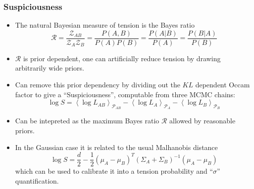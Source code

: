 \documentclass[aspectratio=169]{beamer}
\newcommand{\mean}[2][]{\left\langle#2\right\rangle_{#1}}
\begin{document}
\begin{frame}
    \frametitle{Suspiciousness  }

    \begin{itemize}
        \item The natural Bayesian measure of tension is the Bayes ratio
            \begin{equation}
                \mathcal{R} = \frac{\mathcal{Z}_{AB}}{\mathcal{Z}_A\mathcal{Z}_B} = \frac{P(A,B)}{P(A)P(B)} = \frac{P(A|B)}{P(A)}= \frac{P(B|A)}{P(B)}
            \end{equation}
        \item $\mathcal{R}$ is prior dependent, one can artificially reduce tension by drawing arbitrarily wide priors.
        \item Can remove this prior dependency by dividing out the $KL$ dependent Occam factor to give a ``Suspiciousness'', computable from three MCMC chains:
            \begin{equation}
                \log S = \mean[\mathcal{P}_{AB}]{\log L_{AB}} - \mean[\mathcal{P}_{A}]{\log L_{A}}- \mean[\mathcal{P}_{B}]{\log L_{B}}
            \end{equation}
        \item Can be intepreted as the maximum Bayes ratio $\mathcal{R}$ allowed by reasonable priors.
        \item In the Gaussian case it is related to the usual Malhanobis distance
            \begin{equation}
                \log S = \frac{d}{2} - \frac{1}{2}(\mu_A-\mu_B)^T(\Sigma_A+\Sigma_B)^{-1}(\mu_A-\mu_B) 
            \end{equation}
            which can be used to calibrate it into a tension probability and ``$\sigma$'' quantification.
    \end{itemize}
\end{frame}
\end{document}
